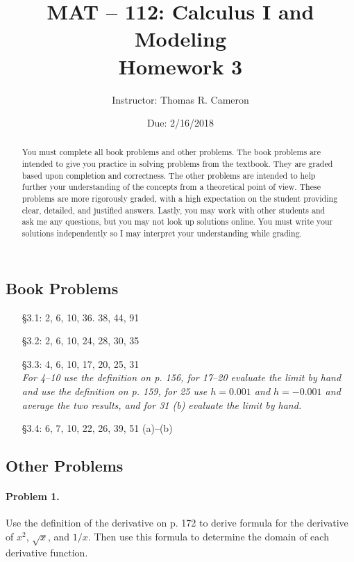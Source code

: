 \documentclass{article}
\title{MAT -- 112: Calculus I and Modeling\\
\large{Homework 3}}
\author{Instructor: Thomas R. Cameron}
\date{Due: 2/16/2018}
\begin{document}
\maketitle

\begin{abstract}
You must complete all book problems and other problems. The book problems are intended to give you practice in solving problems from the textbook. They are graded based upon completion and correctness. The other problems are intended to help further your understanding of the concepts from a theoretical point of view. These problems are more rigorously graded, with a high expectation on the student providing clear, detailed, and justified answers. Lastly, you may work with other students and ask me any questions, but you may not look up solutions online. You must write your solutions independently so I may interpret your understanding while grading. 
\end{abstract}

\subsection*{Book Problems}
\begin{itemize}
\item   [\S 3.1:] 2, 6, 10, 36. 38, 44, 91
\item   [\S 3.2:] 2, 6, 10, 24, 28, 30, 35
\item   [\S 3.3:] 4, 6, 10, 17, 20, 25, 31 \\
\emph{For 4--10 use the definition on p. 156, for 17--20 evaluate the limit by hand and use the definition on p. 159, for 25 use $h=0.001$ and $h=-0.001$ and average the two results, and for 31 (b) evaluate the limit by hand.}
\item   [\S 3.4:] 6, 7, 10, 22, 26, 39, 51 (a)--(b)
\end{itemize}

\subsection*{Other Problems}

\paragraph*{Problem 1.} Use the definition of the derivative on p. 172 to derive formula for the derivative of $x^{2}$, $\sqrt{x}$, and $1/x$. Then use this formula to determine the domain of each derivative function. 
\end{document}
